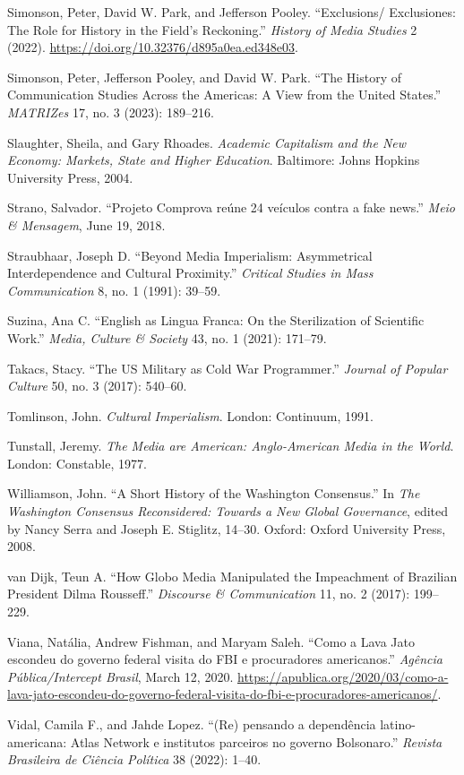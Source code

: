 \documentclass{tufte-handout}
\begin{document}
\begin{hangparas}{.25in}{1}
Simonson, Peter, David W. Park, and Jefferson Pooley.
``Exclusions/ Exclusiones: The Role for History in the Field's
Reckoning.'' \emph{History of Media Studies} 2 (2022).
\url{https://doi.org/10.32376/d895a0ea.ed348e03}.

Simonson, Peter, Jefferson Pooley, and David W. Park. ``The History of
Communication Studies Across the Americas: A View from the United
States.'' \emph{MATRIZes} 17, no. 3 (2023): 189--216.

Slaughter, Sheila, and Gary Rhoades. \emph{Academic Capitalism and the
New Economy: Markets, State and Higher Education}. Baltimore: Johns
Hopkins University Press, 2004.

Strano, Salvador. ``Projeto Comprova reúne 24 veículos contra a fake
news.'' \emph{Meio \& Mensagem}, June 19, 2018.

Straubhaar, Joseph D. ``Beyond Media Imperialism: Asymmetrical
Interdependence and Cultural Proximity.'' \emph{Critical Studies in Mass
Communication} 8, no. 1 (1991): 39--59.

Suzina, Ana C. ``English as Lingua Franca: On the Sterilization of
Scientific Work.'' \emph{Media, Culture \& Society} 43, no. 1 (2021):
171--79.

Takacs, Stacy. ``The US Military as Cold War Programmer.'' \emph{Journal
of Popular Culture} 50, no. 3 (2017): 540--60.

Tomlinson, John. \emph{Cultural Imperialism}. London: Continuum, 1991.

Tunstall, Jeremy. \emph{The Media are American: Anglo-American Media in
the World}. London: Constable, 1977.

Williamson, John. ``A Short History of the Washington Consensus.'' In
\emph{The Washington Consensus Reconsidered: Towards a New Global
Governance}, edited by Nancy Serra and Joseph E. Stiglitz, 14--30.
Oxford: Oxford University Press, 2008.

van Dijk, Teun A. ``How Globo Media Manipulated the Impeachment of
Brazilian President Dilma Rousseff.'' \emph{Discourse \& Communication}
11, no. 2 (2017): 199--229.

Viana, Natália, Andrew Fishman, and Maryam Saleh. ``Como a Lava Jato
escondeu do governo federal visita do FBI e procuradores americanos.''
\emph{Agência Pública/Intercept Brasil}, March 12, 2020.
\href{https://apublica.org/2020/03/como-a-lava-jato-escondeu-do-governo-federal-visita-do-fbi-e-procuradores-americanos/}{https://apublica.org/2020/03/como-a-lava-jato-escondeu-do-governo-federal-visita-do-fbi-e-procuradores-americanos/}.

Vidal, Camila F., and Jahde Lopez. ``(Re) pensando a dependência
latino-americana: Atlas Network e institutos parceiros no governo
Bolsonaro.'' \emph{Revista Brasileira de Ciência Política} 38 (2022):
1--40.



\end{hangparas}
\end{document}
